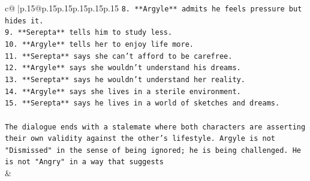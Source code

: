 \documentclass{article}
\begin{document}
{\begin{supertabular}{c@{$\;$}|p{.15\linewidth}@{}p{.15\linewidth}p{.15\linewidth}p{.15\linewidth}p{.15\linewidth}p{.15\linewidth}}
{{{\texttt{8.  **Argyle** admits he feels pressure but hides it.} \\
\texttt{9.  **Serepta** tells him to study less.} \\
\texttt{10. **Argyle** tells her to enjoy life more.} \\
\texttt{11. **Serepta** says she can't afford to be carefree.} \\
\texttt{12. **Argyle** says she wouldn't understand his dreams.} \\
\texttt{13. **Serepta** says he wouldn't understand her reality.} \\
\texttt{14. **Argyle** says she lives in a sterile environment.} \\
\texttt{15. **Serepta** says he lives in a world of sketches and dreams.} \\
\\ 
\texttt{The dialogue ends with a stalemate where both characters are asserting their own validity against the other's lifestyle. Argyle is not "Dismissed" in the sense of being ignored; he is being challenged. He is not "Angry" in a way that suggests} \\
            }
        }
    }
    & \\ \\

\end{supertabular}
}
\end{document}
